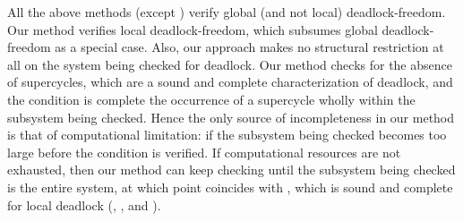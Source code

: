 All the above methods (except ) verify global (and not
local) deadlock-freedom.  Our method verifies local deadlock-freedom, which subsumes 
global deadlock-freedom as a special case.
Also, our approach makes no
structural restriction at all on the system being checked for deadlock.  Our method checks
for the absence of supercycles, which are a sound and complete characterization of
deadlock, and the \LAO condition is complete \wrt the occurrence of a supercycle wholly
within the subsystem being checked. 
Hence the only source of incompleteness in our method is that of computational
limitation: if the subsystem being checked becomes too large before 
the \LAO condition is verified. If computational resources are not exhausted, then our
method can keep checking until the subsystem being checked is the entire system, at which
point \LAO coincides with \GAO, which is sound and complete for local deadlock
(, , and ).






